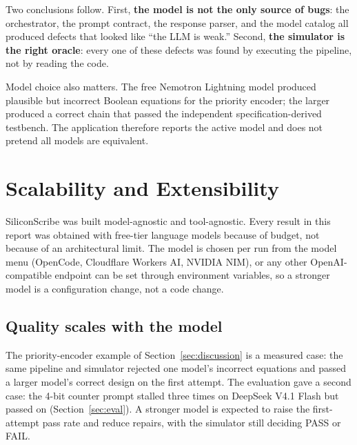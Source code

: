 Two conclusions follow. First, \textbf{the model is not the only source of bugs}:
the orchestrator, the prompt contract, the response parser, and the model catalog
all produced defects that looked like ``the LLM is weak.'' Second, \textbf{the
simulator is the right oracle}: every one of these defects was found by executing
the pipeline, not by reading the code.

Model choice also matters. The free Nemotron Lightning model produced plausible but
incorrect Boolean equations for the priority encoder; the larger
 produced a correct  chain
that passed the independent specification-derived testbench. The application therefore reports
the active model and does not pretend all models are equivalent.

\section{Scalability and Extensibility}
\label{sec:scale}

SiliconScribe was built model-agnostic and tool-agnostic. Every result in this report was obtained with free-tier language models because of budget, not because of an architectural limit. The model is chosen per run from the model menu (OpenCode, Cloudflare Workers AI, NVIDIA NIM), or any other OpenAI-compatible endpoint can be set through environment variables, so a stronger model is a configuration change, not a code change.

\subsection{Quality scales with the model}
The priority-encoder example of Section~\ref{sec:discussion} is a measured case: the same pipeline and simulator rejected one model's incorrect equations and passed a larger model's correct design on the first attempt. The evaluation gave a second case: the 4-bit counter prompt stalled three times on DeepSeek V4.1 Flash but passed on  (Section~\ref{sec:eval}). A stronger model is expected to raise the first-attempt pass rate and reduce repairs, with the simulator still deciding PASS or FAIL.


